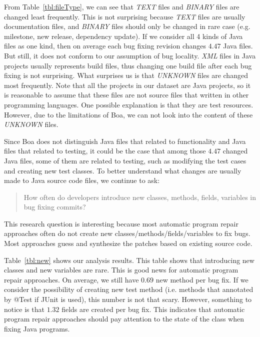 \documentclass{sig-alternate-05-2015}
\begin{document}
From Table~\ref{tbl:fileType}, we can see that \emph{TEXT} files and
\emph{BINARY} files are changed least frequently. This is not surprising because
\emph{TEXT} files are usually documentation files, and \emph{BINARY} files
should only be changed in rare case (e.g.  milestone, new release, dependency
update). If we consider all 4 kinds of Java files as one kind, then on average
each bug fixing revision changes $4.47$ Java files. But still, it does not
conform to our assumption of bug locality. \emph{XML} files in Java projects
usually represents build files, thus changing one build file after each bug
fixing is not surprising.  What surprises us is that \emph{UNKNOWN} files are
changed most frequently. Note that all the projects in our dataset are Java
projects, so it is reasonable to assume that these files are not source files
that written in other programming languages.  One possible explanation is that
they are test resources. However, due to the limitations of Boa, we can not look
into the content of these \emph{UNKNOWN} files. 

Since Boa does not distinguish Java files that related to functionality and Java
files that related to testing, it could be the case that among those $4.47$
changed Java files, some of them are related to testing, such as modifying the
test cases and creating new test classes. To better understand what changes are
usually made to Java source code files, we continue to ask:

\begin{quote}
	How often do developers introduce new classes, methods, fields, variables in
	bug fixing commits?
\end{quote}

This research question is interesting because most automatic program repair
approaches often do not create new classes/methods/fields/variables to fix bugs.
Most approaches guess and synthesize the patches based on existing source code.

Table~\ref{tbl:new} shows our analysis results. This table shows that
introducing new classes and new variables are rare. This is good news for
automatic program repair approaches. On average, we still have $0.69$ new method
per bug fix. If we consider the possibility of creating new test method (i.e.
methods that annotated by @Test if JUnit is used), this number is not that
scary. However, something to notice is that $1.32$ fields are created per bug fix.
This indicates that automatic program repair approaches should pay attention to
the state of the class when fixing Java programs.
\end{document}
